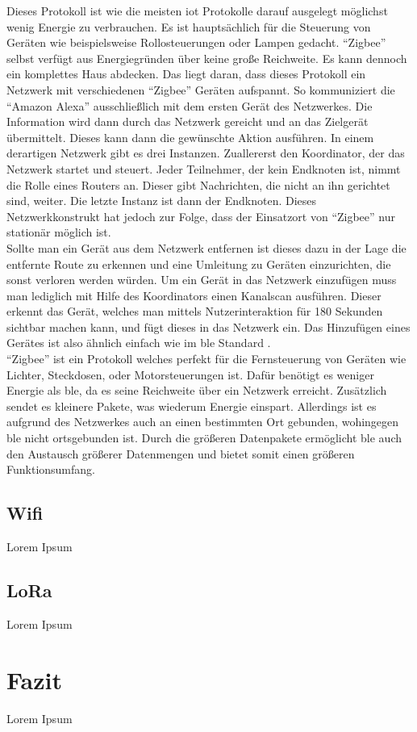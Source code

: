 Dieses Protokoll ist wie die meisten \ac{iot} Protokolle darauf ausgelegt möglichst wenig Energie zu verbrauchen. Es ist hauptsächlich für die Steuerung von Geräten wie beispielsweise Rollosteuerungen oder Lampen gedacht. "`Zigbee"' selbst verfügt aus Energiegründen über keine große Reichweite. Es kann dennoch ein komplettes Haus abdecken. Das liegt daran, dass dieses Protokoll ein Netzwerk mit verschiedenen "`Zigbee"' Geräten aufspannt. So kommuniziert die "`Amazon Alexa"' ausschließlich mit dem ersten Gerät des Netzwerkes. Die Information wird dann durch das Netzwerk gereicht und an das Zielgerät übermittelt. Dieses kann dann die gewünschte Aktion ausführen. In einem derartigen Netzwerk gibt es drei Instanzen. Zuallererst den Koordinator, der das Netzwerk startet und steuert. Jeder Teilnehmer, der kein Endknoten ist, nimmt die Rolle eines Routers an. Dieser gibt Nachrichten, die nicht an ihn gerichtet sind, weiter. Die letzte Instanz ist dann der Endknoten. Dieses Netzwerkkonstrukt hat jedoch zur Folge, dass der Einsatzort von "`Zigbee"' nur stationär möglich ist.\\

\noindent Sollte man ein Gerät aus dem Netzwerk entfernen ist dieses dazu in der Lage die entfernte Route zu erkennen und eine Umleitung zu Geräten einzurichten, die sonst verloren werden würden. Um ein Gerät in das Netzwerk einzufügen muss man lediglich mit Hilfe des Koordinators einen Kanalscan ausführen. Dieser erkennt das Gerät, welches man mittels Nutzerinteraktion für 180 Sekunden sichtbar machen kann, und fügt dieses in das Netzwerk ein. Das Hinzufügen eines Gerätes ist also ähnlich einfach wie im \ac{ble} Standard \cite{ZA:Zig}.\\

\noindent "`Zigbee"' ist ein Protokoll welches perfekt für die Fernsteuerung von Geräten wie Lichter, Steckdosen, oder Motorsteuerungen ist. Dafür benötigt es weniger Energie als \ac{ble}, da es seine Reichweite über ein Netzwerk erreicht. Zusätzlich sendet es kleinere Pakete, was wiederum Energie einspart. Allerdings ist es aufgrund des Netzwerkes auch an einen bestimmten Ort gebunden, wohingegen \ac{ble} nicht ortsgebunden ist. Durch die größeren Datenpakete ermöglicht \ac{ble} auch den Austausch größerer Datenmengen und bietet somit einen größeren Funktionsumfang.\\

\subsection{Wifi}
\label{ss:vergleich:wifi}

Lorem Ipsum

\subsection{LoRa}
\label{ss:vergleich:lora}

Lorem Ipsum

\section{Fazit}
\label{s:fazit}

Lorem Ipsum
